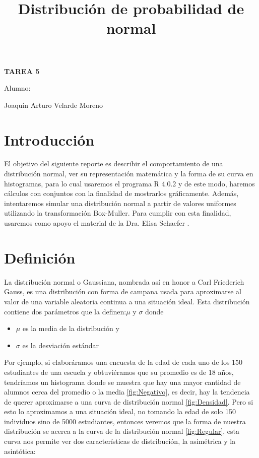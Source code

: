 \documentclass[]{article}
\title{Distribución de probabilidad de normal }
\date{}
\begin{document}
	\maketitle
	\begin{center}


\centerline{\textbf{TAREA 5} } 
\textbf{ }

\centerline{Alumno: } 
\centerline{Joaquín Arturo Velarde Moreno}


	\end{center}
	

\section{Introducción}
El objetivo del siguiente reporte es describir el comportamiento de una distribución normal, ver su representación matemática y la forma de su curva en histogramas, para lo cual usaremos el programa R 4.0.2 \cite{rproject} y de este modo, haremos cálculos con conjuntos con la finalidad de mostrarlos gráficamente. Además, intentaremos simular una distribución normal a partir de valores uniformes utilizando la transformación Box-Muller. Para cumplir con esta finalidad, usaremos como apoyo el material de la Dra. Elisa Schaefer \cite{MaterialClase}.


\section{Definición}
La distribución normal o Gaussiana, nombrada así en honor a Carl Friederich Gauss, es una distribución con forma de campana usada para aproximarse al valor de una variable aleatoria continua a una situación ideal. Esta distribución contiene dos parámetros que la definen:$\mu$ y $\sigma$
donde
\begin{itemize}
	\item $\mu$ es la media de la distribución y 
	\item $\sigma$ es la desviación estándar
\end{itemize}
Por ejemplo, si elaboráramos una encuesta de la edad de cada uno de los 150 estudiantes de una escuela y obtuviéramos que su promedio es de 18 años, tendríamos un histograma donde se muestra que hay una mayor cantidad de alumnos cerca del promedio o la media \autoref{fig:Negativo}, es decir, hay la tendencia de querer aproximarse a una curva de distribución normal \autoref{fig:Densidad}.
Pero si esto lo aproximamos a una situación ideal, no tomando la edad de solo 150 individuos sino de 5000 estudiantes, entonces veremos que la forma de nuestra distribución se acerca a la curva de la distribución normal \autoref{fig:Regular}, esta curva nos permite ver dos características de distribución, la asimétrica y la asintótica:
\end{document}
